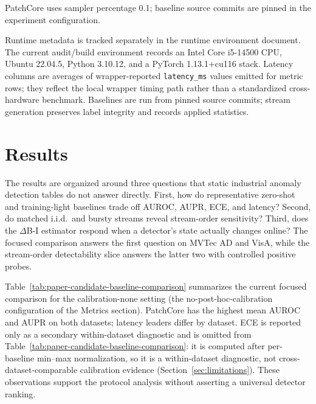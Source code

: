\documentclass[runningheads]{llncs}
\newcommand{\tabref}[1]{Table~\ref{#1}}
\newcommand{\secref}[1]{Section~\ref{#1}}
\begin{document}
PatchCore uses sampler percentage 0.1; baseline source commits are pinned in
the experiment configuration.

Runtime metadata is tracked separately in the runtime environment document. The
current audit/build environment records an Intel Core i5-14500 CPU, Ubuntu
22.04.5, Python 3.10.12, and a PyTorch 1.13.1+cu116 stack. Latency columns are
averages of wrapper-reported \texttt{latency\_ms} values emitted for metric
rows; they reflect the local wrapper timing path rather than a standardized
cross-hardware benchmark. Baselines are run from pinned source commits; stream
generation preserves label integrity and records applied statistics.

\section{Results}
The results are organized around three questions that static industrial anomaly
detection tables do not answer directly. First, how do representative
zero-shot and training-light baselines trade off AUROC, AUPR, ECE, and
latency? Second, do matched i.i.d.\ and bursty streams reveal stream-order
sensitivity? Third, does the $\Delta$B-I estimator respond when a detector's
state actually changes online? The focused comparison answers the first
question on MVTec AD and VisA, while the stream-order detectability slice
answers the latter two with controlled positive probes.

\tabref{tab:paper-candidate-baseline-comparison} summarizes the current
focused comparison for the calibration-none setting (the no-post-hoc-calibration
configuration of the Metrics section). PatchCore has the
highest mean AUROC and AUPR on both datasets; latency leaders differ by dataset.
ECE is reported only as a secondary within-dataset diagnostic and is omitted from
\tabref{tab:paper-candidate-baseline-comparison}: it is computed after per-baseline
min--max normalization, so it is a within-dataset diagnostic, not
cross-dataset-comparable calibration evidence (\secref{sec:limitations}). These
observations support the protocol analysis without asserting a universal detector
ranking.

\begin{table}[t]
\centering
\caption{Baseline comparison across MVTec AD and VisA for calibration
\texttt{none}. Values summarize the current category-sharded focused
evaluation. Latency values are local-runtime averages (see
\secref{sec:setup}); they are not a standardized cross-hardware benchmark.}
\label{tab:paper-candidate-baseline-comparison}
\resizebox{0.7\textwidth}{!}{}
\end{table}
\end{document}
